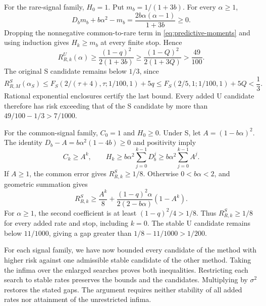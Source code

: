 For the rare-signal family, $H_0=1$. Put $m_b=1/(1+3b)$. For every
$\alpha\geq1$,
\[
 D_bm_b+b\alpha^2-m_b
   =\frac{2b\alpha(\alpha-1)}{1+3b}\geq0.
\]
Dropping the nonnegative common-to-rare term in
\eqref{eq:predictive-moments} and using induction gives $H_k\geq m_b$ at
every finite stop. Hence
\[
 R_{R,k}^U(\alpha)\geq\frac{(1-q)^2}{2(1+3b)}
 \geq\frac{(1-Q)^2}{2(1+3Q)}>\frac{49}{100}.
\]
The original S candidate remains below $1/3$, since
\[
 R_{R,M}^S(\alpha_S)
 \leq F_S(2/(\tau+4),\tau;1/100,1)+5q
 \leq F_S(2/5,1;1/100,1)+5Q<\frac13.
\]
Rational exponential enclosures certify the last bound. Every added U candidate
therefore has risk exceeding that of the S candidate by more than
$49/100-1/3>7/1000$.

For the common-signal family, $C_0=1$ and $H_0\geq0$. Under S, let
$A=(1-b\alpha)^2$. The identity
$D_b-A=b\alpha^2(1-4b)\geq0$ and positivity imply
\[
 C_k\geq A^k,\qquad
 H_k\geq b\alpha^2\sum_{j=0}^{k-1}D_b^j
       \geq b\alpha^2\sum_{j=0}^{k-1}A^j.
\]
If $A\geq1$, the common error gives $R_{R,k}^S\geq1/8$. Otherwise
$0<b\alpha<2$, and geometric summation gives
\[
 R_{R,k}^S\geq\frac{A^k}{8}
       +\frac{(1-q)^2\alpha}{2(2-b\alpha)}(1-A^k).
\]
For $\alpha\geq1$, the second coefficient is at least $(1-q)^2/4>1/8$.
Thus $R_{R,k}^S\geq1/8$ for every added rate and stop, including $k=0$.
The stable U candidate remains below $11/1000$, giving a gap greater than
$1/8-11/1000>1/200$.

For each signal family, we have now bounded every candidate of the method with
higher risk against one admissible stable candidate of the other method. Taking
the infima over the enlarged searches proves both inequalities. Restricting
each search to stable rates preserves the bounds and the candidates.
Multiplying by $\sigma^2$ restores the stated gaps. The argument requires
neither stability of all added rates nor attainment of the unrestricted infima.
